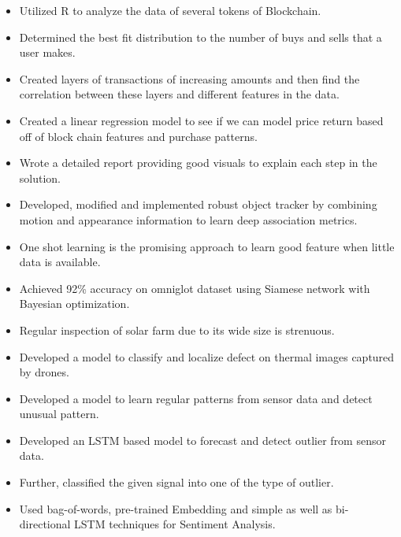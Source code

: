 \begin{itemize}
\item Utilized R to analyze the data of several tokens of Blockchain.
\item Determined the best fit distribution to the number of buys
and sells that a user makes.
\item Created layers of transactions of increasing amounts and then find the correlation between these layers and different features in the data.
\item Created a linear regression model to see if we can model price return based off of block chain features and purchase patterns.
\item Wrote a detailed report providing good visuals to explain each step in the solution.
\end{itemize}
\smallskip
{}
\begin{itemize}
\item Developed, modified and implemented robust object tracker by combining motion and appearance information to learn deep association metrics.
\end{itemize}
\smallskip
{}
\begin{itemize}
\item One shot learning is the promising approach to learn good feature when little data is available.
\item Achieved 92\% accuracy on omniglot dataset using Siamese network with Bayesian optimization.
\end{itemize}
\smallskip
{}
\begin{itemize}
\item Regular inspection of solar farm due to its wide size is strenuous.
\item Developed a model to classify and localize defect on thermal images captured by drones.
\end{itemize}
\smallskip
{}
\begin{itemize}
\item Developed a model to learn regular patterns from sensor data and detect unusual pattern.
\end{itemize}
\smallskip
{}
\begin{itemize}
\item Developed an LSTM based model to forecast and detect outlier from sensor data.
\item Further, classified the given signal into one of the type of outlier.
\end{itemize}
\smallskip
{}
\begin{itemize}
    \item Used bag-of-words, pre-trained Embedding and simple as well as bi-directional LSTM techniques for Sentiment Analysis.
\end{itemize}

